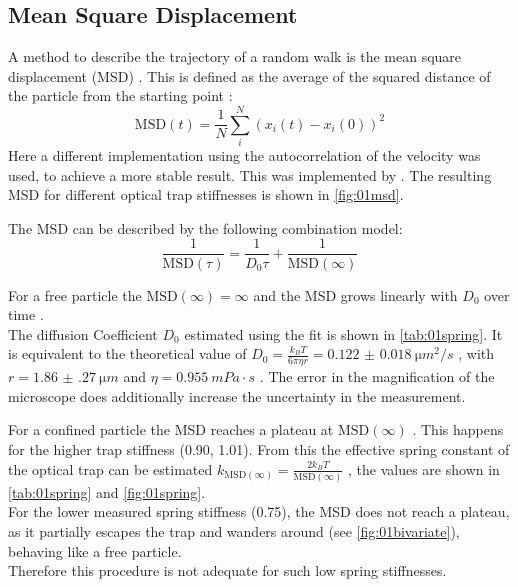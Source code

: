 \documentclass[
    twoside=false,
    twocolumn=true,
    fontsize=11pt,
]{scrarticle}
\begin{document}
\subsection*{Mean Square Displacement}
A method to describe the trajectory of a random walk is the mean square displacement (MSD) \cite{wiki:msd}.
This is defined as the average of the squared distance of the particle from the starting point \cite{wiki:msd}:
\begin{equation}
    \text{MSD}(t) = \frac{1}{N} \sum_i^N \left( x_i\left(t\right) - x_i\left(0\right) \right)^2 
\end{equation}
Here a different implementation using the autocorrelation of the velocity was used, to achieve a more stable result.
This was implemented by \cite{jl:msd}.
The resulting MSD for different optical trap stiffnesses is shown in \autoref{fig:01msd}.

The MSD can be described by the following combination model:
\begin{equation}
    \frac{1}{\text{MSD}(\tau)} = \frac{1}{D_0 \tau} + \frac{1}{\text{MSD}(\infty)}
    \label{eq:01_mdl_msd} 
\end{equation}

For a free particle the $\text{MSD}(\infty)=\infty$ and the MSD grows linearly with $D_0$ over time \cite{wiki:msd,instructions}.\\
The diffusion Coefficient $D_0$ estimated using the fit is shown in \autoref{tab:01spring}.
It is equivalent to the theoretical value of $D_0 = \frac{k_B T}{6 \pi \eta r} = \SI{0.122(18)}{\micro m ^2 / s}$ \cite{instructions}, with $r = \SI{1.86(27)}{\micro m}$ and $\eta = \SI{0.955}{mPa\cdot s}$ \cite{n:water}.
The error in the magnification of the microscope does additionally increase the uncertainty in the measurement.

For a confined particle the MSD reaches a plateau at $\text{MSD}(\infty)$ \cite{instructions}.
This happens for the higher trap stiffness (\SI{0.90}{}, \SI{1.01}{}).
From this the effective spring constant of the optical trap can be estimated $k_{\text{MSD}(\infty)} = \frac{2 k_B T}{\text{MSD}(\infty)}$ \cite{instructions},
the values are shown in  \autoref{tab:01spring} and \autoref{fig:01spring}.\\
For the lower measured spring stiffness (\SI{0.75}{}), the MSD does not reach a plateau, as it partially escapes the trap and wanders around (see \autoref{fig:01bivariate}), behaving like a free particle.\\
Therefore this procedure is not adequate for such low spring stiffnesses.
\end{document}
